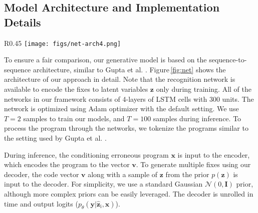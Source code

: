 \documentclass[runningheads]{llncs}
\newcommand{\figref}{Figure}
\begin{document}
\subsection{Model Architecture and Implementation Details}
	
\begin{wrapfigure}[11]{R}{0.45\linewidth}
\vspace{-.8cm}
\centering
    \texttt{[image: figs/net-arch4.png]}
    \caption{Overview of network architecture.}
\label{fig:net}
\end{wrapfigure}

To ensure a fair comparison, our generative model is based on the sequence-to-sequence architecture, similar to Gupta et al. \cite{Gupta2017DeepFixFC}. \figref \,\ref{fig:net} shows the architecture of our approach in detail. Note that the recognition network is available to encode the fixes to latent variables $\textbf{z}$ only during training.
All of the networks in our framework consists of 4-layers of LSTM cells with 300 units. The network is optimized using Adam optimizer \cite{kingma15adam} with the default setting.
We use $T = 2$ samples to train our models, and $T = 100$ samples during inference. To process the program through the networks, we tokenize the programs similar to the setting used by Gupta et al. \cite{Gupta2017DeepFixFC}.

During inference, the conditioning erroneous program $\textbf{x}$ is input to the encoder, which encodes the program to the vector $\textbf{v}$. To generate multiple fixes using our decoder, the code vector $\textbf{v}$ along with a sample of $\textbf{z}$ from the prior $p(\textbf{z})$ is input to the decoder. For simplicity, we use a standard Gaussian $\mathcal{N}(0,\textbf{I})$  prior, although more complex priors can be easily leveraged. The decoder is unrolled in time and output logits ($p_{\theta}(\textbf{y} | \hat{\textbf{z}}_{\text{i}}, \textbf{x})$). 
\end{document}
